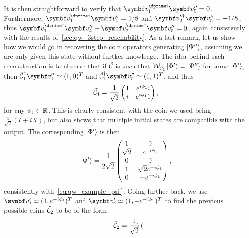 \begin{example}[label=ex:qw_conditions_few_steps]
\begin{equation}
    \end{equation}
    It is then straightforward to verify that
    $\bs v_1^{\dprime\dagger}\bs v_5'' = 0$.
    Furthermore,
    $\bs v_1^{\dprime\dagger}\bs v_4'' = 1/8$
    and $\bs v_2^{\prime\prime\dagger}\bs v_5'' = -1/8$,
    thus 
    $\bs v_1^{\dprime\dagger}\bs v_4'' + \bs v_2^{\dprime\dagger}\bs v_5'' = 0$,
    again consistently with the results of~\cref{sec:qw_3step_reachability}.
    As a last remark, let us show how we would go in recovering the coin operators generating $\ket{\Psi''}$, assuming we are only given this state without further knowledge.
    The idea behind such reconstruction is to observe that if $\tilde{{\mathcal{C}}}$ is such that ${\mathcal{W}}_{\tilde{{\mathcal{C}}}_1}\ket{\Phi'}=\ket{\Psi''}$ for some $\ket{\Phi'}$, then $\tilde\calC_1^\dagger \bs v_1''\simeq(1,0)^T$ and $\tilde\calC_1^\dagger \bs v_5''\simeq(0,1)^T$, and thus
    \begin{equation}
        \tilde{{\mathcal{C}}}_1 =
        \frac{1}{\sqrt2} \begin{pmatrix}
            1 & e^{i\phi_1}i \\
            i & e^{i\phi_1}1
        \end{pmatrix},
    \end{equation}
    for any $\phi_1\in\mathbb{R}$. This is clearly consistent with the coin we used being $\frac{1}{\sqrt2}(I+iX)$, but also shows that multiple initial states are compatible with the output. The corresponding $\ket{\Phi'}$ is then
    \begin{equation}
        \ket{\Phi'} = \frac{1}{2\sqrt2}
        \begin{pmatrix}
            1 & 0 \\
            \sqrt2 & e^{-i\phi_1} \\
            0 & 0 \\
            1 & \sqrt2 e^{-i\phi_1} \\
            0 & -e^{-i\phi_1}
        \end{pmatrix},
    \end{equation}
    consistently with~\cref{eq:qw_example_psi'}.
    Going further back, we use $\bs v_1'\simeq(1,e^{-i\phi_1})^T$ and $\bs v_4'\simeq(1,-e^{-i\phi_1})^T$ to find the previous possible coins $\tilde{{\mathcal{C}}}_2$ to be of the form
    \begin{equation}
        \tilde{{\mathcal{C}}}_2 = \frac{1}{\sqrt2} \begin{pmatrix}

\end{pmatrix}
\end{equation}
\end{example}
